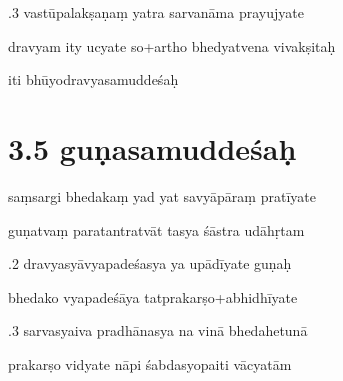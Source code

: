 \documentclass[article,12pt,a4paper]{memoir}%
\newcounter{parCount}
\begin{document}
	  
	  \pstart {}.3 vastūpalakṣaṇaṃ yatra sarvanāma prayujyate 
	{}
	\pend%
      

	  
	  \pstart \leavevmode%
	dravyam ity ucyate so+artho bhedyatvena vivakṣitaḥ 
	{}
	\pend%
      

	  
	  \pstart \leavevmode%
	iti bhūyodravyasamuddeśaḥ
	{}
	\pend%
      
	  
	
\chapter[{3.5 guṇasamuddeśaḥ}][{3.5 guṇasamuddeśaḥ}]{ 3.5 guṇasamuddeśaḥ}
	  
	

	  
	  \pstart \leavevmode%
	saṃsargi bhedakaṃ yad yat savyāpāraṃ pratīyate 
	{}
	\pend%
      

	  
	  \pstart \leavevmode%
	guṇatvaṃ paratantratvāt tasya śāstra udāhṛtam 
	{}
	\pend%
      

	  
	  \pstart {}.2 dravyasyāvyapadeśasya ya upādīyate guṇaḥ 
	{}
	\pend%
      

	  
	  \pstart \leavevmode%
	bhedako vyapadeśāya tatprakarṣo+abhidhīyate 
	{}
	\pend%
      

	  
	  \pstart {}.3 sarvasyaiva pradhānasya na vinā bhedahetunā 
	{}
	\pend%
      

	  
	  \pstart \leavevmode%
	prakarṣo vidyate nāpi śabdasyopaiti vācyatām 
	{}
	\pend%
      
\end{document}
